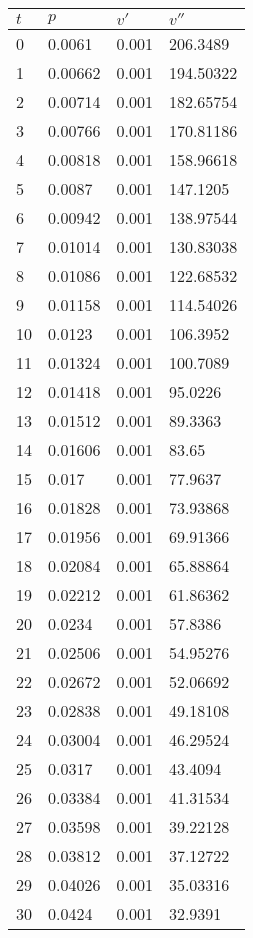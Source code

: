 \documentclass[twocolumn]{article}
\begin{document}
\begin{tabular}{l|l|l|l}
$	t$ &$ p$ &$ v'$ & $v''$ \\ \hline
0	&	0.0061	&	0.001	&	206.3489 \\ \hline
1	&	0.00662	&	0.001	&	194.50322 \\ \hline
2	&	0.00714	&	0.001	&	182.65754 \\ \hline
3	&	0.00766	&	0.001	&	170.81186 \\ \hline
4	&	0.00818	&	0.001	&	158.96618 \\ \hline
5	&	0.0087	&	0.001	&	147.1205 \\ \hline
6	&	0.00942	&	0.001	&	138.97544 \\ \hline
7	&	0.01014	&	0.001	&	130.83038 \\ \hline
8	&	0.01086	&	0.001	&	122.68532 \\ \hline
9	&	0.01158	&	0.001	&	114.54026 \\ \hline
10	&	0.0123	&	0.001	&	106.3952 \\ \hline
11	&	0.01324	&	0.001	&	100.7089 \\ \hline
12	&	0.01418	&	0.001	&	95.0226 \\ \hline
13	&	0.01512	&	0.001	&	89.3363 \\ \hline
14	&	0.01606	&	0.001	&	83.65 \\ \hline
15	&	0.017	&	0.001	&	77.9637 \\ \hline
16	&	0.01828	&	0.001	&	73.93868 \\ \hline
17	&	0.01956	&	0.001	&	69.91366 \\ \hline
18	&	0.02084	&	0.001	&	65.88864 \\ \hline
19	&	0.02212	&	0.001	&	61.86362 \\ \hline
20	&	0.0234	&	0.001	&	57.8386 \\ \hline
21	&	0.02506	&	0.001	&	54.95276 \\ \hline
22	&	0.02672	&	0.001	&	52.06692 \\ \hline
23	&	0.02838	&	0.001	&	49.18108 \\ \hline
24	&	0.03004	&	0.001	&	46.29524 \\ \hline
25	&	0.0317	&	0.001	&	43.4094 \\ \hline
26	&	0.03384	&	0.001	&	41.31534 \\ \hline
27	&	0.03598	&	0.001	&	39.22128 \\ \hline
28	&	0.03812	&	0.001	&	37.12722 \\ \hline
29	&	0.04026	&	0.001	&	35.03316 \\ \hline
30	&	0.0424	&	0.001	&	32.9391 \\ \hline

\end{tabular}
\end{document}
